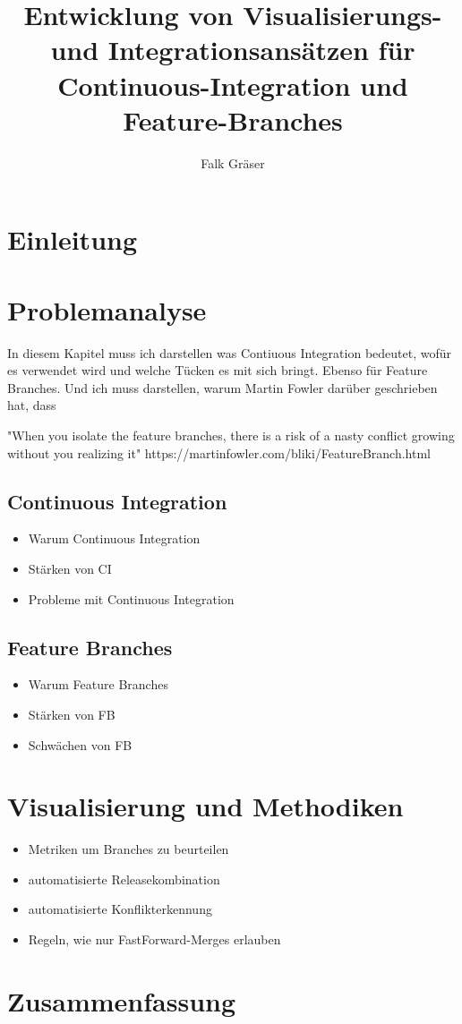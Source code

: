 \documentclass[10pt,a4paper]{book}
\author{Falk Gräser}
\title{Entwicklung von Visualisierungs- und Integrationsansätzen für Continuous-Integration und Feature-Branches}
\begin{document}
\maketitle

\newpage

\chapter{Einleitung}

\chapter{Problemanalyse}

In diesem Kapitel muss ich darstellen was Contiuous Integration bedeutet, wofür es verwendet wird und welche Tücken es mit sich bringt.
Ebenso für Feature Branches.
Und ich muss darstellen, warum Martin Fowler darüber geschrieben hat, dass 

"When you isolate the feature branches, there is a risk of a nasty conflict growing without you realizing it"
https://martinfowler.com/bliki/FeatureBranch.html


\section{Continuous Integration}

\begin{itemize}
\item Warum Continuous Integration
\item Stärken von CI
\item Probleme mit Continuous Integration
\end{itemize}

\section{Feature Branches}

\begin{itemize}
\item Warum Feature Branches
\item Stärken von FB
\item Schwächen von FB
\end{itemize}

\chapter{Visualisierung und Methodiken}

\begin{itemize}
\item Metriken um Branches zu beurteilen
\item automatisierte Releasekombination
\item automatisierte Konflikterkennung
\item Regeln, wie nur FastForward-Merges erlauben
\end{itemize}

\chapter{Zusammenfassung}
\end{document}
